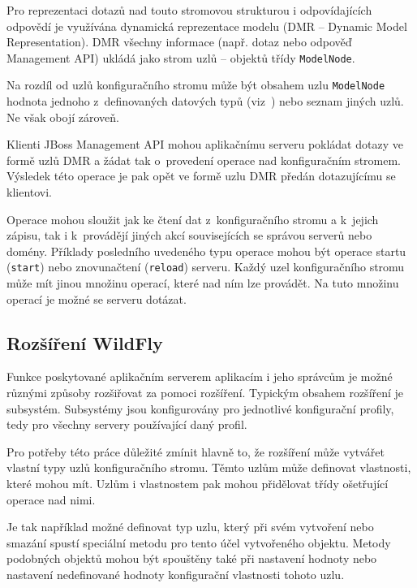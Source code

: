 Pro reprezentaci dotazů nad touto stromovou strukturou i odpovídajících odpovědí je využívána dynamická reprezentace modelu (DMR -- Dynamic Model Representation).
DMR všechny informace (např. dotaz nebo odpověď Management API) ukládá jako strom uzlů -- objektů třídy {\tt ModelNode}.
\cite{jbossDetypedManagement}

Na rozdíl od uzlů konfiguračního stromu může být obsahem uzlu {\tt ModelNode} hodnota jednoho z~definovaných datových typů (viz~\cite{jboss7slideShare}) nebo seznam jiných uzlů. Ne však obojí zároveň.
\cite{jboss7slideShare}

Klienti JBoss Management API mohou aplikačnímu serveru pokládat dotazy ve formě uzlů DMR a žádat tak o~provedení operace nad konfiguračním stromem.
Výsledek této operace je pak opět ve formě uzlu DMR předán dotazujícímu se klientovi.
\cite{jbossDetypedManagement}

Operace mohou sloužit jak ke čtení dat z~konfiguračního stromu a k~jejich zápisu, tak i k~provádějí jiných akcí souvisejících se správou serverů nebo domény.
Příklady posledního uvedeného typu operace mohou být operace startu ({\tt start}) nebo znovunačtení ({\tt reload}) serveru.
Každý uzel konfiguračního stromu může mít jinou množinu operací, které nad ním lze provádět.
Na tuto množinu operací je možné se serveru dotázat.
\cite{jbossDetypedManagement}

\subsection{Rozšíření WildFly} \label{rozsireniWildFly}

Funkce poskytované aplikačním serverem aplikacím i jeho správcům je možné různými způsoby rozšiřovat za pomoci rozšíření.
Typickým obsahem rozšíření je subsystém. Subsystémy jsou konfigurovány pro jednotlivé konfigurační profily, tedy pro všechny servery používající daný profil.

Pro potřeby této práce důležité zmínit hlavně to, že rozšíření může vytvářet vlastní typy uzlů konfiguračního stromu.
Těmto uzlům může definovat vlastnosti, které mohou mít.
Uzlům i vlastnostem pak mohou přidělovat třídy ošetřující operace nad nimi.
\cite{WildFlyExtending}

Je tak například možné definovat typ uzlu, který při svém vytvoření nebo smazání spustí speciální metodu pro tento účel vytvořeného objektu.
Metody podobných objektů mohou být spouštěny také při nastavení hodnoty nebo nastavení nedefinované hodnoty konfigurační vlastnosti tohoto uzlu.

